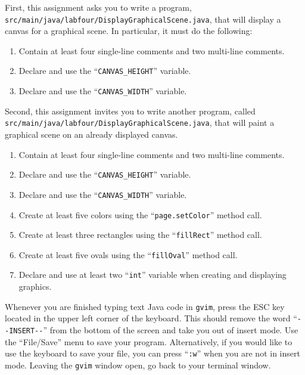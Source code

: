 \documentclass[11pt]{article}
\newcommand{\mainprogramsource}{\lstinline{src/main/java/labfour/DisplayGraphicalScene.java}}
\newcommand{\secondprogramsource}{\lstinline{src/main/java/labfour/DisplayGraphicalScene.java}}
\newcommand{\command}[1]{``\lstinline{#1}''}
\newcommand{\program}[1]{\lstinline{#1}}
\newcommand{\option}[1]{``{#1}''}
\begin{document}
First, this assignment asks you to write a program, \mainprogramsource{}, that will display a canvas for a graphical
scene. In particular, it must do the following:

\vspace*{-.1in}
\begin{enumerate}
  \setlength{\itemsep}{0pt}

\item Contain at least four single-line comments and two multi-line comments.
\item Declare and use the \command{CANVAS_HEIGHT} variable.
\item Declare and use the \command{CANVAS_WIDTH} variable.

\end{enumerate}

\vspace*{-.1in}
Second, this assignment invites you to write another program, called \secondprogramsource{}, that will paint a graphical
scene on an already displayed canvas.

\vspace*{-.1in}
\begin{enumerate}
  \setlength{\itemsep}{0pt}

\item Contain at least four single-line comments and two multi-line comments.
\item Declare and use the \command{CANVAS_HEIGHT} variable.
\item Declare and use the \command{CANVAS_WIDTH} variable.
\item Create at least five colors using the \command{page.setColor} method call.
\item Create at least three rectangles using the \command{fillRect} method call.
\item Create at least five ovals using the \command{fillOval} method call.
\item Declare and use at least two \command{int} variable when creating and displaying graphics.

\end{enumerate}

Whenever you are finished typing text Java code in \program{gvim}, press the ESC key located in the upper left corner of
the keyboard. This should remove the word \command{--INSERT--} from the bottom of the screen and take you out of insert
mode. Use the \option{File/Save} menu to save your program. Alternatively, if you would like to use the keyboard to save
your file, you can press \command{:w} when you are not in insert mode. Leaving the {\tt gvim} window open, go back to
your terminal window.
\end{document}

